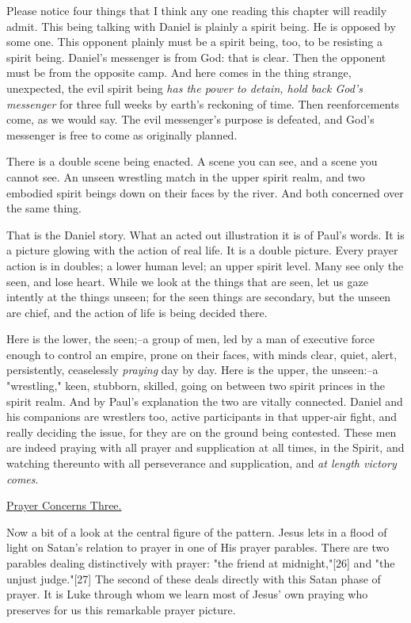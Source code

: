 Please notice four things that I think any one reading this chapter will
readily admit. This being talking with Daniel is plainly a spirit being.
He is opposed by some one. This opponent plainly must be a spirit being,
too, to be resisting a spirit being. Daniel's messenger is from God: that
is clear. Then the opponent must be from the opposite camp. And here comes
in the thing strange, unexpected, the evil spirit being \textit{has the power to
detain, hold back God's messenger} for three full weeks by earth's
reckoning of time. Then reenforcements come, as we would say. The evil
messenger's purpose is defeated, and God's messenger is free to come as
originally planned.

There is a double scene being enacted. A scene you can see, and a scene
you cannot see. An unseen wrestling match in the upper spirit realm, and
two embodied spirit beings down on their faces by the river. And both
concerned over the same thing.

That is the Daniel story. What an acted out illustration it is of Paul's
words. It is a picture glowing with the action of real life. It is a
double picture. Every prayer action is in doubles; a lower human level; an
upper spirit level. Many see only the seen, and lose heart. While we look
at the things that are seen, let us gaze intently at the things unseen;
for the seen things are secondary, but the unseen are chief, and the
action of life is being decided there.

Here is the lower, the seen;--a group of men, led by a man of executive
force enough to control an empire, prone on their faces, with minds clear,
quiet, alert, persistently, ceaselessly \textit{praying} day by day. Here is the
upper, the unseen:--a "wrestling," keen, stubborn, skilled, going on
between two spirit princes in the spirit realm. And by Paul's explanation
the two are vitally connected. Daniel and his companions are wrestlers
too, active participants in that upper-air fight, and really deciding the
issue, for they are on the ground being contested. These men are indeed
praying with all prayer and supplication at all times, in the Spirit, and
watching thereunto with all perseverance and supplication, and \textit{at length
victory comes}.



\underline{Prayer Concerns Three.}


Now a bit of a look at the central figure of the pattern. Jesus lets in a
flood of light on Satan's relation to prayer in one of His prayer
parables. There are two parables dealing distinctively with prayer: "the
friend at midnight,"[26] and "the unjust judge."[27] The second of these
deals directly with this Satan phase of prayer. It is Luke through whom we
learn most of Jesus' own praying who preserves for us this remarkable
prayer picture.

